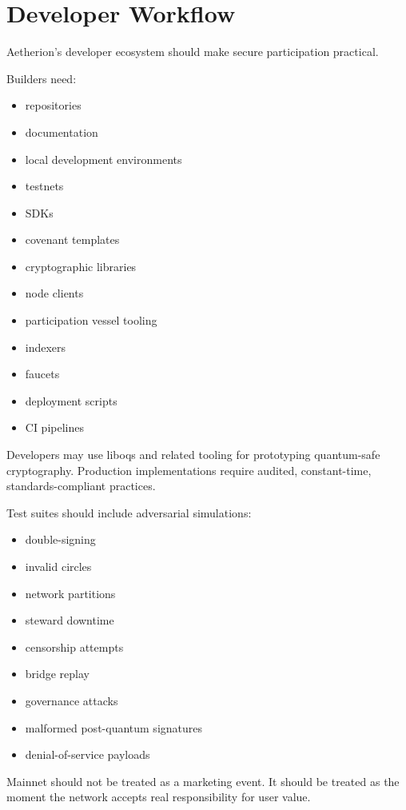 ﻿\documentclass[12pt]{article}
\begin{document}
\section{Developer Workflow}


Aetherion's developer ecosystem should make secure participation practical.

Builders need:

\begin{itemize}
  \item repositories
  \item documentation
  \item local development environments
  \item testnets
  \item SDKs
  \item covenant templates
  \item cryptographic libraries
  \item node clients
  \item participation vessel tooling
  \item indexers
  \item faucets
  \item deployment scripts
  \item CI pipelines
\end{itemize}

Developers may use liboqs and related tooling for prototyping quantum-safe cryptography. Production implementations require audited, constant-time, standards-compliant practices.

Test suites should include adversarial simulations:

\begin{itemize}
  \item double-signing
  \item invalid circles
  \item network partitions
  \item steward downtime
  \item censorship attempts
  \item bridge replay
  \item governance attacks
  \item malformed post-quantum signatures
  \item denial-of-service payloads
\end{itemize}

Mainnet should not be treated as a marketing event. It should be treated as the moment the network accepts real responsibility for user value.
\end{document}
